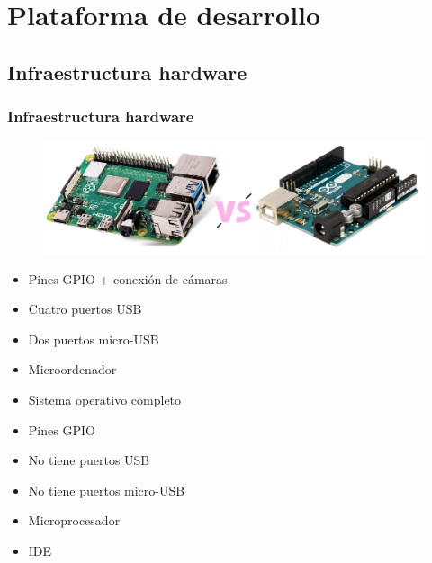 \documentclass{beamer}
\begin{document}
\section{Plataforma de desarrollo}
\subsection{Infraestructura hardware}
\begin{frame}
\frametitle{Infraestructura hardware}
\begin{figure}
\centering
\includegraphics[width=12cm]{figs/VS}
\end{figure}
\begin{multicols}{2}

\begin{itemize}
\centering
\item[] Pines GPIO + conexión de cámaras
\item[] Cuatro puertos USB
\item[] Dos puertos micro-USB
\item[] Microordenador
\item[] Sistema operativo completo
\item[] Pines GPIO
\item[] No tiene puertos USB
\item[] No tiene puertos micro-USB
\item[] Microprocesador
\item[] IDE
\end{itemize}

\end{multicols}
\end{frame}
\end{document}
